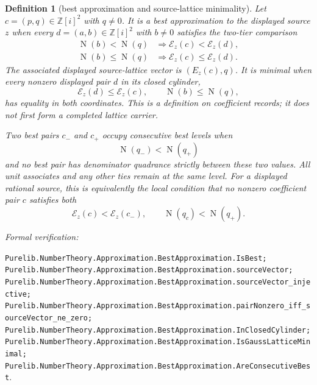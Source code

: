 \documentclass[11pt]{article}
\newtheorem{definition}[definition]{Definition}
\newcommand{\Zi}{\mathbb{Z}[i]}
\newcommand{\Norm}[1]{\operatorname{N}\!\left(#1\right)}
\newcommand{\leanref}[1]{\par\smallskip\noindent
  \emph{Formal verification:}\par\nobreak
  {\raggedright\nolinkurl{#1}.\par}}
\begin{document}
\begin{definition}[best approximation and source-lattice minimality]
\label{def:best-approximation}
Let $c=(p,q)\in\Zi^2$ with $q\ne0$.  It is a \emph{best approximation} to
the displayed source $z$ when every $d=(a,b)\in\Zi^2$ with $b\ne0$
satisfies the two-tier comparison
\begin{align}
 \Norm b<\Norm q
   &\Longrightarrow \mathcal E_z(c)<\mathcal E_z(d),
   \label{eq:best-strict}\\
 \Norm b\le\Norm q
   &\Longrightarrow \mathcal E_z(c)\le\mathcal E_z(d).
   \label{eq:best-weak}
\end{align}
The associated displayed source-lattice vector is $(E_z(c),q)$.  It is
\emph{minimal} when every nonzero displayed pair $d$ in its closed cylinder,
\[
       \mathcal E_z(d)\le\mathcal E_z(c),\qquad
       \Norm b\le\Norm q,
\]
has equality in both coordinates.  This is a definition on coefficient
records; it does not first form a completed lattice carrier.

Two best pairs $c_-$ and $c_+$ occupy \emph{consecutive best levels} when
\[
  \Norm{q_-}<\Norm{q_+}
\]
and no best pair has denominator quadrance strictly between these two values.
All unit associates and any other ties remain at the same level.  For a
displayed rational source, this is equivalently the local condition that no
nonzero coefficient pair $c$ satisfies both
\[
 \mathcal E_z(c)<\mathcal E_z(c_-),
 \qquad \Norm{q_c}<\Norm{q_+}.
\]
\end{definition}

\leanref{Purelib.NumberTheory.Approximation.BestApproximation.IsBest;
Purelib.NumberTheory.Approximation.BestApproximation.sourceVector;
Purelib.NumberTheory.Approximation.BestApproximation.sourceVector_injective;
Purelib.NumberTheory.Approximation.BestApproximation.pairNonzero_iff_sourceVector_ne_zero;
Purelib.NumberTheory.Approximation.BestApproximation.InClosedCylinder;
Purelib.NumberTheory.Approximation.BestApproximation.IsGaussLatticeMinimal;
Purelib.NumberTheory.Approximation.BestApproximation.AreConsecutiveBest}
\end{document}
